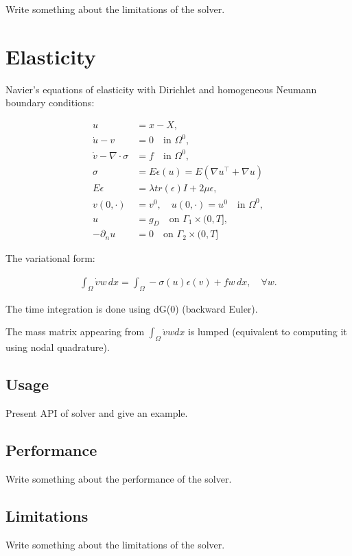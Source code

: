Write something about the limitations of the solver.

\section{Elasticity}

Navier's equations of elasticity with Dirichlet and homogeneous Neumann
boundary conditions:

\begin{equation*}
\label{classicalelast}
\begin{split}
u &= x - X,\\
\dot{u}-v &= 0\quad\mbox{in } \Omega^0,\\
\dot{v} - \nabla \cdot \sigma& =f \quad\mbox{in } \Omega^0,\\
\sigma &= E\epsilon (u) = E(\nabla u^\top +\nabla u)\\
E\epsilon &= \lambda tr(\epsilon) I + 2\mu \epsilon,\\
v(0,\cdot ) &= v^0,\quad u(0,\cdot ) = u^0\quad\mbox{in } \Omega^0, \\
u &= g_D \quad \mbox{on } \Gamma_1 \times (0,T], \\
- \partial_n u &= 0 \quad \mbox{on } \Gamma_2 \times (0,T]
\end{split}
\end{equation*}

The variational form:

\begin{equation} \label{eq:elasticity-varform}
\begin{array}{rcl}
  \int_{\Omega} \dot{v} w \, dx = \int_{\Omega} -\sigma(u) \epsilon(v) + f w \, dx,
  \quad \forall w.
\end{array}
\end{equation}

The time integration is done using dG(0) (backward Euler).

The mass matrix appearing from $\int_{\Omega} \dot{v} w dx$ is lumped
(equivalent to computing it using nodal quadrature).

\subsection{Usage}

Present API of solver and give an example.

\subsection{Performance}

Write something about the performance of the solver.

\subsection{Limitations}

Write something about the limitations of the solver.
